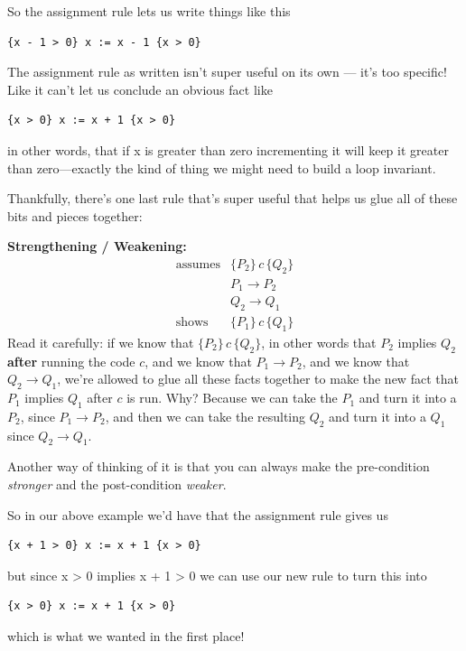 \documentclass[11pt]{article}
\begin{document}
So the assignment rule lets us write things like this
\begin{lstlisting}
{x - 1 > 0} x := x - 1 {x > 0}
\end{lstlisting}

The assignment rule as written isn't super useful on its own --- it's too specific! Like it can't let us conclude an obvious fact like
\begin{lstlisting}
{x > 0} x := x + 1 {x > 0}
\end{lstlisting}
in other words, that if x is greater than zero incrementing it will keep it greater than zero---exactly the kind of thing we might need to build a loop invariant.

Thankfully, there's one last rule that's super useful that helps us glue all of these bits and pieces together:

\noindent\textbf{Strengthening / Weakening:}
\[
  \begin{array}{rl}
    \text{assumes} & \{P_2\}\, c\, \{Q_2\} \\
                   & P_1 \to P_2 \\
                   & Q_2 \to Q_1 \\
    \hline
    \text{shows} & \{P_1\}\, c\, \{Q_1\}
  \end{array}
\]
Read it carefully: if we know that $\{P_2\}\, c\, \{Q_2\}$, in other words that $P_2$ implies $Q_2$ \textbf{after} running the code $c$, and we know that $P_1 \to P_2$, and we know that $Q_2 \to Q_1$, we're allowed to glue all these facts together to make the new fact that $P_1$ implies $Q_1$ after $c$ is run. Why? Because we can take the $P_1$ and turn it into a $P_2$, since $P_1 \to P_2$, and then we can take the resulting $Q_2$ and turn it into a $Q_1$ since $Q_2 \to Q_1$.

Another way of thinking of it is that you can always make the pre-condition \emph{stronger} and the post-condition \emph{weaker}.

So in our above example we'd have that the assignment rule gives us

\begin{lstlisting}
{x + 1 > 0} x := x + 1 {x > 0}
\end{lstlisting}
but since x > 0 implies x + 1 > 0 we can use our new rule to turn this into
\begin{lstlisting}
{x > 0} x := x + 1 {x > 0}
\end{lstlisting}
which is what we wanted in the first place!
\end{document}
